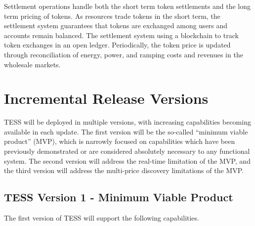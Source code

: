 \documentclass[10pt,twocolumn]{article}
\begin{document}
Settlement operations handle both the short term token settlements and the long term pricing of tokens.  As resources trade tokens in the short term, the settlement system guarantees that tokens are exchanged among users and accounts remain balanced.  The settlement system using a blockchain to track token exchanges in an open ledger. Periodically, the token price is updated through reconciliation of energy, power, and ramping costs and revenues in the wholesale markets.

\section{Incremental Release Versions}

TESS will be deployed in multiple versions, with increasing capabilities becoming available in each update.  The first version will be the so-called ``minimum viable product'' (MVP), which is narrowly focused on capabilities which have been previously demonstrated or are considered absolutely necessary to any functional system.  The second version will address the real-time limitation of the MVP, and the third version will address the multi-price discovery limitations of the MVP.

\subsection{TESS Version 1 - Minimum Viable Product}

The first version of TESS will support the following capabilities.
\end{document}
